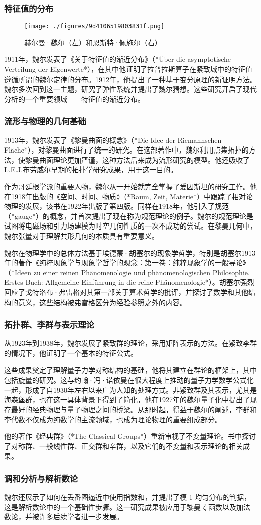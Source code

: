 \subsubsection{特征值的分布 } 
\begin{figure}[ht]
\centering
\texttt{[image: ./figures/9d4106519803831f.png]}
\caption{赫尔曼·魏尔（左）和恩斯特·佩施尔（右）} \label{fig_WR_2}
\end{figure}
1911年，魏尔发表了《关于特征值的渐近分布》（*Über die asymptotische Verteilung der Eigenwerte*），在其中他证明了拉普拉斯算子在紧致域中的特征值遵循所谓的魏尔定律的分布。1912年，他提出了一种基于变分原理的新证明方法。魏尔多次回到这一主题，研究了弹性系统并提出了魏尔猜想。这些研究开启了现代分析的一个重要领域——特征值的渐近分布。
\subsubsection{流形与物理的几何基础}
1913年，魏尔发表了《黎曼曲面的概念》（*Die Idee der Riemannschen Fläche*），对黎曼曲面进行了统一的研究。在这部著作中，魏尔利用点集拓扑的方法，使黎曼曲面理论更加严谨，这种方法后来成为流形研究的模型。他还吸收了L.E.J.布劳威尔早期的拓扑学研究成果，用于这一目的。  

作为哥廷根学派的重要人物，魏尔从一开始就完全掌握了爱因斯坦的研究工作。他在1918年出版的《空间、时间、物质》（*Raum, Zeit, Materie*）中跟踪了相对论物理的发展，该书在1922年出版了第四版。同样在1918年，他引入了规范（*gauge*）的概念，并首次提出了现在称为规范理论的例子。魏尔的规范理论是试图将电磁场和引力场建模为时空几何性质的一次不成功的尝试。在黎曼几何中，魏尔张量对于理解共形几何的本质具有重要意义。  

魏尔在物理学中的总体方法基于埃德蒙·胡塞尔的现象学哲学，特别是胡塞尔1913年的著作《纯粹现象学与现象学哲学的观念：第一卷：纯粹现象学的一般导论》（*Ideen zu einer reinen Phänomenologie und phänomenologischen Philosophie. Erstes Buch: Allgemeine Einführung in die reine Phänomenologie*）。胡塞尔强烈回应了戈特洛布·弗雷格对其第一部关于算术哲学的批评，并探讨了数学和其他结构的意义，这些结构被弗雷格区分为经验参照之外的内容。
\subsubsection{拓扑群、李群与表示理论}
从1923年到1938年，魏尔发展了紧致群的理论，采用矩阵表示的方法。在紧致李群的情况下，他证明了一个基本的特征公式。  

这些成果奠定了理解量子力学对称结构的基础，他将其建立在群论的框架上，其中包括旋量的研究。这与约翰·冯·诺依曼在很大程度上推动的量子力学数学公式化一起，形成了自1930年左右以来广为人知的处理方式。非紧致群及其表示，尤其是海森堡群，也在这一具体背景下得到了简化，他在1927年的魏尔量子化中提出了现存最好的经典物理与量子物理之间的桥梁。从那时起，得益于魏尔的阐述，李群和李代数不仅成为纯数学的主流领域，也成为理论物理的重要组成部分。  

他的著作《经典群》（*The Classical Groups*）重新审视了不变量理论。书中探讨了对称群、一般线性群、正交群和辛群，以及它们的不变量和表示理论的相关成果。
\subsubsection{调和分析与解析数论} 
魏尔还展示了如何在丢番图逼近中使用指数和，并提出了模 1 均匀分布的判据，这是解析数论中的一个基础性步骤。这一研究成果被应用于黎曼 ζ 函数以及加法数论，并被许多后续学者进一步发展。